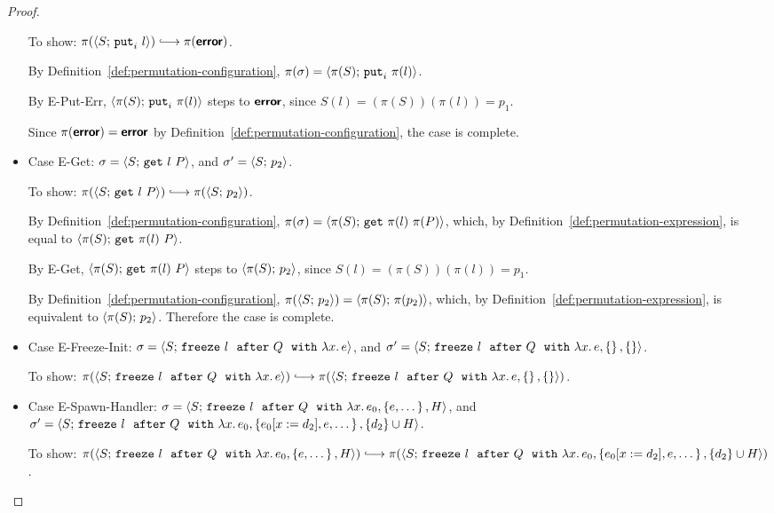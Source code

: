 \begin{proof}
\begin{itemize}
      To show: $\pi(\config{S}{\putiexp{l}}) \parstepsto
      \pi(\error)$.

      By Definition~\ref{def:permutation-configuration}, $\pi(\sigma) =
      \langle \pi(S);\, \mbox{\texttt{put}}_i~\pi(l) \rangle$.

      By {\sc E-Put-Err}, $\langle \pi(S);\, \mbox{\texttt{put}}_i~\pi(l) \rangle$ steps to
      $\textbf{\textsf{error}}$, since $S(l) = (\pi(S))(\pi(l)) = p_1$.

      Since $\pi(\textbf{\textsf{error}}) = \textbf{\textsf{error}}$ by
      Definition~\ref{def:permutation-configuration}, the case is
      complete.
    \item Case {\sc E-Get}: $\sigma = \langle S;\, \mbox{\texttt{get}}~l~P \rangle$, and
      $\sigma' = \langle S;\, p_2 \rangle$.

      To show: $\pi(\config{S}{\getexp{l}{P}}) \parstepsto
      \pi(\config{S}{p_2})$.

      By Definition~\ref{def:permutation-configuration}, $\pi(\sigma) =
      \langle \pi(S);\, \mbox{\texttt{get}}~\pi(l)~\pi(P) \rangle$, which, by
      Definition~\ref{def:permutation-expression}, is equal to
      $\langle \pi(S);\, \mbox{\texttt{get}}~\pi(l)~P \rangle$.

      By {\sc E-Get}, $\langle \pi(S);\, \mbox{\texttt{get}}~\pi(l)~P \rangle$ steps to
      $\langle \pi(S);\, p_2 \rangle$, since $S(l) = (\pi(S))(\pi(l)) = p_1$.

      By Definition~\ref{def:permutation-configuration},
      $\pi(\langle S;\, p_2 \rangle) = \langle \pi(S);\, \pi(p_2) \rangle$, which, by
      Definition~\ref{def:permutation-expression}, is equivalent to
      $\langle \pi(S);\, p_2 \rangle$.  Therefore the case is complete.
    \item Case {\sc E-Freeze-Init}: $\sigma =
      \langle S;\, \mbox{\texttt{freeze}}~l~~{\mbox{\texttt{after}}}~Q~~{\mbox{\texttt{with}}}~\lambda x.\,e \rangle$, and $\sigma' =
      \langle S;\, \mbox{\texttt{freeze}}~l~~{\mbox{\texttt{after}}}~Q~~{\mbox{\texttt{with}}}~\lambda x.\,e, \left\{\right\}, \left\{\right\} \rangle$.

      To show: $\pi(\config{S}{\freezeafter{l}{Q}{\lam{x}{e}}})
      \parstepsto
      \pi(\config{S}{\freezeafterfull{l}{Q}{\lam{x}{e}}{\setof{}}{\setof{}}})$.


    \item Case {\sc E-Spawn-Handler}: $\sigma =
      \langle S;\, \mbox{\texttt{freeze}}~l~~{\mbox{\texttt{after}}}~Q~~{\mbox{\texttt{with}}}~\lambda x.\,e_0, \left\{e,
            \dots\right\}, H \rangle$, and $\sigma' =
      \langle S;\, \mbox{\texttt{freeze}}~l~~{\mbox{\texttt{after}}}~Q~~{\mbox{\texttt{with}}}~\lambda x.\,e_0, \left\{e_0[x := d_2],
            e, \dots\right\}, \{d_2\}\cup H \rangle$.

      To show:
      $\pi(\config{S}{\freezeafterfull{l}{Q}{\lam{x}{e_0}}{\setof{e,
            \dots}}{H}}) \parstepsto
      \pi(\config{S}{\freezeafterfull{l}{Q}{\lam{x}{e_0}}{\setof{\subst{e_0}{x}{d_2},
            e, \dots}} {\{d_2\}\cup H}})$.


\end{itemize}
\end{proof}
